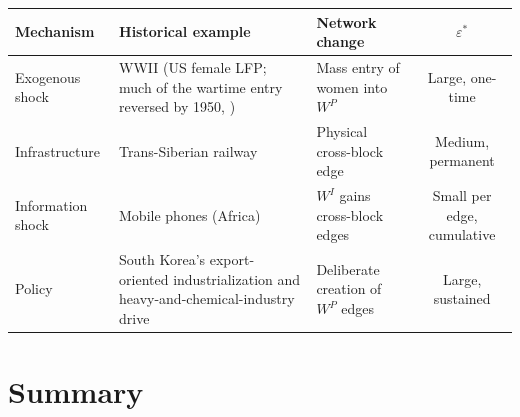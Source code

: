 \documentclass[../structural_economics_book.tex]{subfiles}
\begin{document}
\begin{example}\label{ch13:ex:four_paths}
\begin{center}
\begin{tabularx}{\textwidth}{LLLc}
\toprule
\textbf{Mechanism} & \textbf{Historical example} & \textbf{Network change} & \textbf{$\varepsilon^*$} \\
\midrule
Exogenous shock & WWII (US female LFP; much of the wartime entry reversed by 1950, \citealt{goldin1991role}) & Mass entry of women into $W^P$ & Large, one-time \\
Infrastructure & Trans-Siberian railway & Physical cross-block edge & Medium, permanent \\
Information shock & Mobile phones (Africa) & $W^I$ gains cross-block edges & Small per edge, cumulative \\
Policy & South Korea's export-oriented industrialization and heavy-and-chemical-industry drive & Deliberate creation of $W^P$ edges & Large, sustained \\
\bottomrule
\end{tabularx}
\end{center}
\end{example}


\section{Summary}
\label{ch13:sec:summary}
\end{document}
